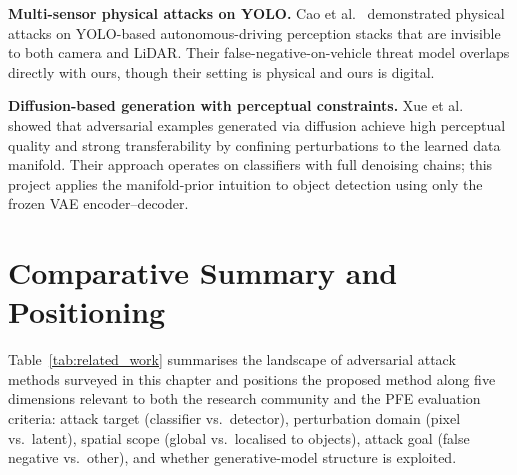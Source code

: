 \documentclass[12pt,a4paper]{report}
\begin{document}
\textbf{Multi-sensor physical attacks on YOLO.}
Cao et al.\ \cite{cao2021invisible} demonstrated physical attacks on
YOLO-based autonomous-driving perception stacks that are invisible to both
camera and LiDAR. Their false-negative-on-vehicle threat model overlaps
directly with ours, though their setting is physical and ours is digital.

\textbf{Diffusion-based generation with perceptual constraints.}
Xue et al.\ \cite{xue2023diffusion} showed that adversarial examples
generated via diffusion achieve high perceptual quality and strong
transferability by confining perturbations to the learned data manifold.
Their approach operates on classifiers with full denoising chains; this
project applies the manifold-prior intuition to object detection using only
the frozen VAE encoder--decoder.

\section{Comparative Summary and Positioning}
\label{sec:related_summary}

Table~\ref{tab:related_work} summarises the landscape of adversarial attack
methods surveyed in this chapter and positions the proposed method along five
dimensions relevant to both the research community and the PFE evaluation
criteria: attack target (classifier vs.\ detector), perturbation domain
(pixel vs.\ latent), spatial scope (global vs.\ localised to objects), attack
goal (false negative vs.\ other), and whether generative-model structure is
exploited.
\end{document}
